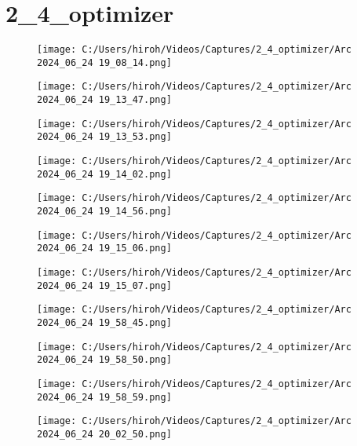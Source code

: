 \documentclass{ltjsarticle}
\begin{document}
\section{2\_4\_optimizer}
\begin{figure}[htbp]
  \centering
  \texttt{[image: C:/Users/hiroh/Videos/Captures/2\_4\_optimizer/Arc 2024\_06\_24 19\_08\_14.png]}
\end{figure}
\begin{figure}[htbp]
  \centering
  \texttt{[image: C:/Users/hiroh/Videos/Captures/2\_4\_optimizer/Arc 2024\_06\_24 19\_13\_47.png]}
\end{figure}
\begin{figure}[htbp]
  \centering
  \texttt{[image: C:/Users/hiroh/Videos/Captures/2\_4\_optimizer/Arc 2024\_06\_24 19\_13\_53.png]}
\end{figure}
\begin{figure}[htbp]
  \centering
  \texttt{[image: C:/Users/hiroh/Videos/Captures/2\_4\_optimizer/Arc 2024\_06\_24 19\_14\_02.png]}
\end{figure}
\begin{figure}[htbp]
  \centering
  \texttt{[image: C:/Users/hiroh/Videos/Captures/2\_4\_optimizer/Arc 2024\_06\_24 19\_14\_56.png]}
\end{figure}
\begin{figure}[htbp]
  \centering
  \texttt{[image: C:/Users/hiroh/Videos/Captures/2\_4\_optimizer/Arc 2024\_06\_24 19\_15\_06.png]}
\end{figure}
\begin{figure}[htbp]
  \centering
  \texttt{[image: C:/Users/hiroh/Videos/Captures/2\_4\_optimizer/Arc 2024\_06\_24 19\_15\_07.png]}
\end{figure}
\begin{figure}[htbp]
  \centering
  \texttt{[image: C:/Users/hiroh/Videos/Captures/2\_4\_optimizer/Arc 2024\_06\_24 19\_58\_45.png]}
\end{figure}
\begin{figure}[htbp]
  \centering
  \texttt{[image: C:/Users/hiroh/Videos/Captures/2\_4\_optimizer/Arc 2024\_06\_24 19\_58\_50.png]}
\end{figure}
\begin{figure}[htbp]
  \centering
  \texttt{[image: C:/Users/hiroh/Videos/Captures/2\_4\_optimizer/Arc 2024\_06\_24 19\_58\_59.png]}
\end{figure}
\begin{figure}[htbp]
  \centering
  \texttt{[image: C:/Users/hiroh/Videos/Captures/2\_4\_optimizer/Arc 2024\_06\_24 20\_02\_50.png]}
\end{figure}
\end{document}

